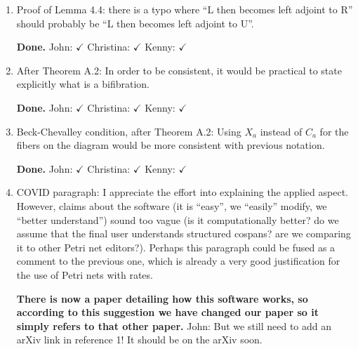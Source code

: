 \documentclass[reqno]{amsart}
\def\chris{\color{purple} Christina: }
\def\john{\color{red} John: }
\def\kenny{\color{blue} Kenny: }
\begin{document}
\begin{enumerate}
{\john  Okay, that makes sense.   I put the paragraph back in and changed it a bunch: basically, I added some more steps so people who don't know what 
we're doing will have an easier time figuring it out.   Does it look okay to you?}

{\chris Yes it does, thanks! Although in my mind, it kinda goes the opposite way: e.g. the already induced monoidal product on the fibers ends up 
having the universal property of a coproduct for example. Possibly just overthinking and getting mixed up with words.}

{\john I changed the paragraph, trying to solve the problem Christina just mentioned.}

{\chris Looks good!}
\fi

\item Proof of Lemma 4.4: there is a typo where “L then becomes left adjoint to R” should probably be “L then becomes left adjoint to U”.

{\bf Done.}  {\john $\checkmark$} {\chris $\checkmark$} {\kenny $\checkmark$}

\item After Theorem A.2: In order to be consistent, it would be practical to state explicitly what is a bifibration.

{\bf Done.} {\john $\checkmark$} {\chris $\checkmark$} {\kenny $\checkmark$}

\item Beck-Chevalley condition, after Theorem A.2: Using $X_a$ instead of $C_a$ for the fibers on the diagram would be more consistent with previous 
notation.

{\bf Done.} {\john $\checkmark$} {\chris $\checkmark$} {\kenny $\checkmark$}

\item COVID paragraph: I appreciate the effort into explaining the applied aspect. However, claims about the software (it is “easy”, we “easily”  modify, we “better understand”) sound too vague (is it computationally better? do we assume that the final user understands structured cospans? are we comparing  it to other Petri net editors?). Perhaps this paragraph could be fused as a comment to the previous one, which is already a very good justification  for the use of Petri nets with rates.

{\bf There is now a paper detailing how this software works, so according to this suggestion we have changed our paper so it simply refers to that other paper.}   {\john But we still need to add an arXiv link in reference 1!  It should be on the arXiv soon.} 


\end{enumerate}
\end{document}
